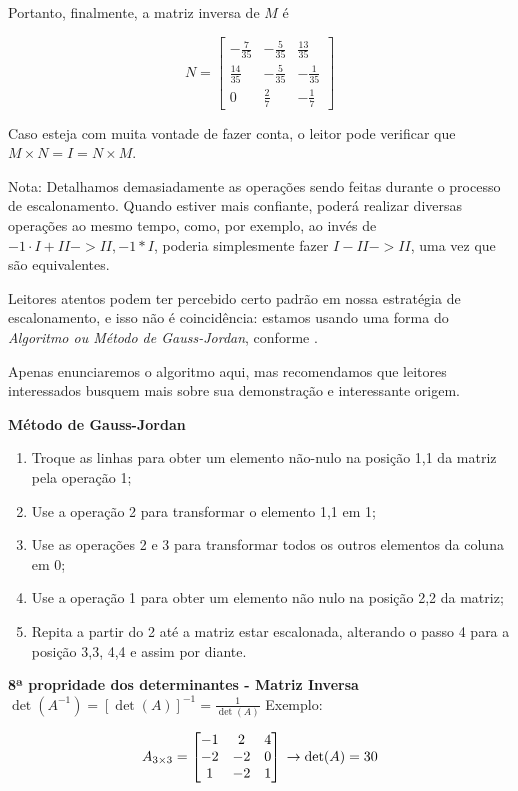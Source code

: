 \documentclass[
  letterpaper,
  DIV=11,
  numbers=noendperiod]{scrreprt}
\begin{document}
Portanto, finalmente, a matriz inversa de \(M\) é

\[
N = 
\begin{bmatrix}
    -\frac{7}{35} & -\frac{5}{35} & \frac{13}{35} \\
    \frac{14}{35} & -\frac{5}{35} & -\frac{1}{35} \\
    0 &\frac{2}{7} & -\frac{1}{7}
\end{bmatrix}
\]

Caso esteja com muita vontade de fazer conta, o leitor pode verificar
que \(M\times N = I = N \times M\).

Nota: Detalhamos demasiadamente as operações sendo feitas durante o
processo de escalonamento. Quando estiver mais confiante, poderá
realizar diversas operações ao mesmo tempo, como, por exemplo, ao invés
de \(-1\cdot I + II -> II, -1*I\), poderia simplesmente fazer
\(I-II->II\), uma vez que são equivalentes.

Leitores atentos podem ter percebido certo padrão em nossa estratégia de
escalonamento, e isso não é coincidência: estamos usando uma forma do
\emph{Algoritmo ou Método de Gauss-Jordan}, conforme
\textcite{sekhon_systems_2020}.

Apenas enunciaremos o algoritmo aqui, mas recomendamos que leitores
interessados busquem mais sobre sua demonstração e interessante origem.

\textbf{Método de Gauss-Jordan}

\begin{enumerate}
\def\labelenumi{\arabic{enumi}.}
\item
  Troque as linhas para obter um elemento não-nulo na posição 1,1 da
  matriz pela operação 1;
\item
  Use a operação 2 para transformar o elemento 1,1 em 1;
\item
  Use as operações 2 e 3 para transformar todos os outros elementos da
  coluna em 0;
\item
  Use a operação 1 para obter um elemento não nulo na posição 2,2 da
  matriz;
\item
  Repita a partir do 2 até a matriz estar escalonada, alterando o passo
  4 para a posição 3,3, 4,4 e assim por diante.
\end{enumerate}

\textbf{8ª propridade dos determinantes - Matriz Inversa}
\(\det(A^{-1}) = [\det(A)]^{-1} = \frac{1}{\det(A)}\) Exemplo:

\[
A_{3\times3} =
\begin{bmatrix}
    -1 & 2 & 4  \\
    -2 & -2 & 0 \\
    1 & -2 & 1 \\
\end{bmatrix}  \\
\rightarrow \det(A) = 30
\]
\end{document}
